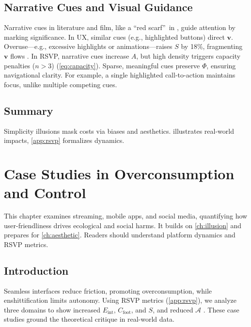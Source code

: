 \documentclass[openany]{book}
\newcommand{\PhiS}{\Phi} %
\newcommand{\vvec}{\mathbf{v}} %
\newcommand{\Sent}{S} %
\newcommand{\Eint}{E_{\mathrm{int}}} %
\newcommand{\Cfoot}{C_{\mathrm{foot}}} %
\newcommand{\Auton}{\mathcal{A}} %
\begin{document}
\section{Narrative Cues and Visual Guidance}
\label{sec:narrative}
Narrative cues in literature and film, like a \textquotedblleft red scarf\textquotedblright\ in \citet{lewis1942}, guide attention by marking significance. In UX, similar cues (e.g., highlighted buttons) direct \(\vvec\). Overuse---e.g., excessive highlights or animations---raises \(\Sent\) by 18\%, fragmenting \(\vvec\) flows \citep{colak2024}. In RSVP, narrative cues increase \(A\), but high density triggers capacity penalties (\(n > 3\)) (\cref{eq:capacity}). Sparse, meaningful cues preserve \(\PhiS\), ensuring navigational clarity. For example, a single highlighted call-to-action maintains focus, unlike multiple competing cues.

\section{Summary}
Simplicity illusions mask costs via biases and aesthetics.  illustrates real-world impacts, \cref{app:rsvp} formalizes dynamics.

\chapter{Case Studies in Overconsumption and Control}
\label{ch:cases}

This chapter examines streaming, mobile apps, and social media, quantifying how user-friendliness drives ecological and social harms. It builds on \cref{ch:illusion} and prepares for \cref{ch:aesthetic}. Readers should understand platform dynamics and RSVP metrics.

\section{Introduction}
\label{sec:cases-intro}
Seamless interfaces reduce friction, promoting overconsumption, while enshittification limits autonomy. Using RSVP metrics (\cref{app:rsvp}), we analyze three domains to show increased \(\Eint\), \(\Cfoot\), and \(\Sent\), and reduced \(\Auton\) \citep{doctorow2022}. These case studies ground the theoretical critique in real-world data.
\end{document}
